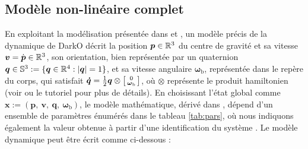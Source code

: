 \subsection{Modèle non-linéaire complet}

En exploitant la modélisation présentée dans \cite{lustosaHal-03035938} et \cite{olszaneckibarthHal-02542982}, un modèle précis de la dynamique de DarkO décrit la position $\boldsymbol{p} \in {\mathbb R}^3$ du centre de gravité et sa vitesse $\boldsymbol{v} = \dot{\boldsymbol{p}} \in {\mathbb R}^3$, son orientation, bien représentée par un quaternion $\boldsymbol{q} \in {\mathbb S}^3:=\{ \boldsymbol{q} \in {\mathbb R}^4 : |\boldsymbol{q}| = 1\}$, et  sa vitesse angulaire $\boldsymbol{\omega}_{\text{b}}$, représentée dans le repère du corps, qui satisfait $\boldsymbol{\dot q} = \frac{1}{2}\boldsymbol{q} \otimes \left[ \begin{smallmatrix}0 \\ \boldsymbol{\omega}_{{\text{b}}} \end{smallmatrix} \right]$, où $\otimes$ représente le produit hamiltonien (voir \cite{lustosaHal-03035938,olszaneckibarthHal-02542982} ou le tutoriel \cite{hamel_minhduc} pour plus de détails).
En choisissant l'état global comme $\boldsymbol{x}:=(\boldsymbol{p},~ \boldsymbol{v},~ \boldsymbol{q},~ \boldsymbol{\omega}_{\text{b}})$, le modèle mathématique, dérivé dans \cite{lustosaHal-03035938}, dépend d'un ensemble de paramètres énumérés dans le tableau \ref{tab:pars}, où nous indiquons également la valeur obtenue à partir d'une identification du système \cite{sansouStage}. Le modèle dynamique peut être écrit comme ci-dessous :

